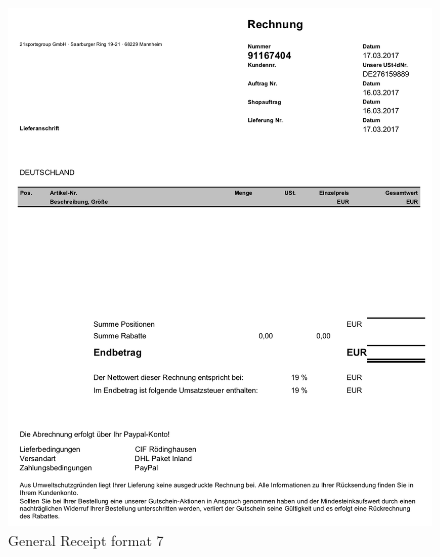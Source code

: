 \begin{figure}[H]
\centering
\includegraphics[scale=0.6]{images/GR-Formats/gs-format-7.png}
\caption{General Receipt format 7}
\label{ls_format2}
\end{figure}
